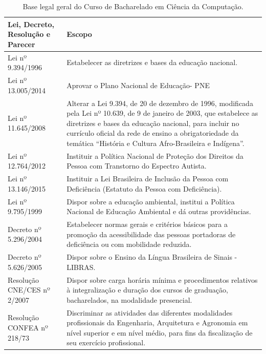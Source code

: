 \documentclass[
	12pt,				%
	openright,			%
  oneside,     %
	a4paper,			%
	chapter=TITLE,		%
	english,			%
	french,				%
	spanish,			%
	brazil				%
	]{abntex2}
\begin{document}
\begin{center}
    
    \begin{scriptsize}
        \begin{longtable}{@{}lp{8.7cm}}
            \caption{\label{quadro:base-legal-geral-curso}Base legal geral do Curso de Bacharelado em Ciência da Computação.}\\
    \toprule
    \textbf{Lei, Decreto, Resolução e Parecer} & \textbf{Escopo} \\ 
    \midrule
    Lei nº 9.394/1996 & Estabelecer as diretrizes e bases da educação nacional.\\ \midrule
    Lei nº 13.005/2014	& Aprovar o Plano Nacional de Educação- PNE \\ \midrule
    Lei nº 11.645/2008	& Alterar a Lei 9.394, de 20 de dezembro de 1996, modificada pela Lei nº 10.639, de 9 de janeiro de 2003, que estabelece as diretrizes e bases da educação nacional, para incluir no currículo oficial da rede de ensino a obrigatoriedade da temática ``História e Cultura Afro-Brasileira e Indígena''. \\ \midrule
    Lei nº 12.764/2012 & Instituir a Política Nacional de Proteção dos Direitos da Pessoa com Transtorno do Espectro Autista. \\ \midrule
    Lei nº 13.146/2015 & Instituir a Lei Brasileira de Inclusão da Pessoa com Deficiência (Estatuto da Pessoa com Deficiência). \\ \midrule
    Lei nº 9.795/1999 & Dispor sobre a educação ambiental, institui a Política Nacional de Educação Ambiental e dá outras providências. \\ \midrule
    Decreto nº 5.296/2004 & Estabelecer normas gerais e critérios básicos para a promoção da 	acessibilidade das pessoas portadoras de deficiência ou com mobilidade reduzida. \\ \midrule
    Decreto nº 5.626/2005 & Dispor sobre o Ensino da Língua Brasileira de Sinais - LIBRAS. \\ \midrule
    Resolução CNE/CES nº 2/2007 & Dispor sobre carga horária mínima e procedimentos relativos à integralização e duração dos cursos de graduação, bacharelados, na modalidade presencial. \\ \midrule
    Resolução CONFEA nº 218/73 & Discriminar as atividades das diferentes modalidades profissionais da Engenharia, Arquitetura e Agronomia em nível superior e em nível médio, para fins da fiscalização de seu exercício profissional. \\ \midrule

\end{longtable}
\end{scriptsize}
\end{center}
\end{document}
